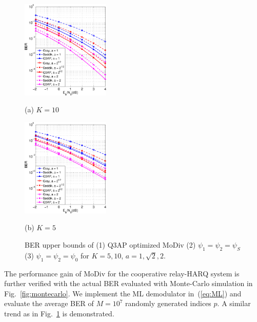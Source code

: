 \documentclass[journal]{IEEEtran}
\begin{document}
\begin{figure}[!t]
    \begin{minipage}[b]{0.49\linewidth}
      \centering
      \centerline{\includegraphics[width=4.2cm]{./figs/bound_10.eps}}
      \centerline{(a) $ K = 10$}\medskip
    \end{minipage}
    \hfill
    \begin{minipage}[b]{0.49\linewidth}
      \centering
      \centerline{\includegraphics[width=4.2cm]{./figs/bound_5.eps}}
      \centerline{(b) $K=5$}\medskip
    \end{minipage}
    \caption{BER upper bounds of (1) Q3AP optimized MoDiv (2) $\psi_1 = \psi_2 =
    \psi_S$ (3) $\psi_1 = \psi_2 = \psi_0$ for $K = 5, 10$, $a = 1, \sqrt{2},
    2$.}
    \label{fig:BERupperbound}
\end{figure}

The performance gain of MoDiv for the cooperative relay-HARQ
system is further verified with the actual BER evaluated with Monte-Carlo
simulation in Fig.~\ref{fig:montecarlo}. We implement the ML demodulator
in~(\ref{eq:ML}) and evaluate the average BER of $M=10^7$ randomly generated
indices $p$. A similar trend as in Fig.~\ref{fig:BERupperbound} is demonstrated.
\end{document}
